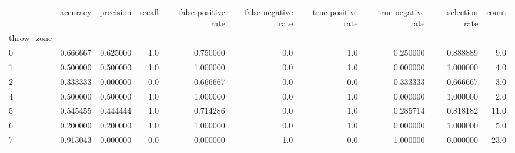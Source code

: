 \begin{tabular}{lrrrrrrrrr}
\toprule
{} &  accuracy &  precision &  recall &  false positive rate &  false negative rate &  true positive rate &  true negative rate &  selection rate &  count \\
throw\_zone &           &            &         &                      &                      &                     &                     &                 &        \\
\midrule
0          &  0.666667 &   0.625000 &     1.0 &             0.750000 &                  0.0 &                 1.0 &            0.250000 &        0.888889 &    9.0 \\
1          &  0.500000 &   0.500000 &     1.0 &             1.000000 &                  0.0 &                 1.0 &            0.000000 &        1.000000 &    4.0 \\
2          &  0.333333 &   0.000000 &     0.0 &             0.666667 &                  0.0 &                 0.0 &            0.333333 &        0.666667 &    3.0 \\
4          &  0.500000 &   0.500000 &     1.0 &             1.000000 &                  0.0 &                 1.0 &            0.000000 &        1.000000 &    2.0 \\
5          &  0.545455 &   0.444444 &     1.0 &             0.714286 &                  0.0 &                 1.0 &            0.285714 &        0.818182 &   11.0 \\
6          &  0.200000 &   0.200000 &     1.0 &             1.000000 &                  0.0 &                 1.0 &            0.000000 &        1.000000 &    5.0 \\
7          &  0.913043 &   0.000000 &     0.0 &             0.000000 &                  1.0 &                 0.0 &            1.000000 &        0.000000 &   23.0 \\
\bottomrule
\end{tabular}
